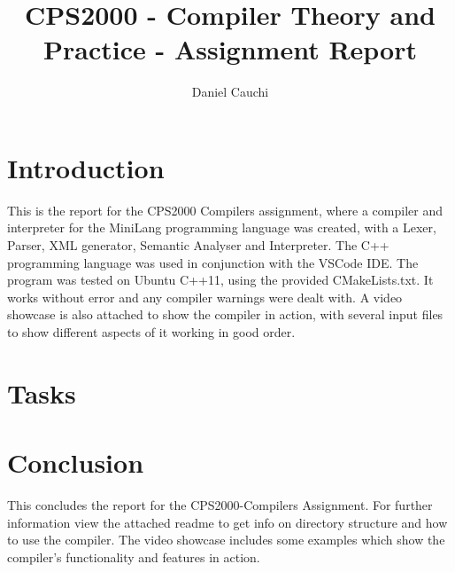 \documentclass{report}
\begin{document}
\title{CPS2000  - Compiler Theory and Practice - Assignment Report}
\author{Daniel Cauchi}
\date{}
\maketitle

\tableofcontents

\chapter{Introduction}
This is the report for the CPS2000 Compilers assignment, where a compiler and interpreter for the MiniLang programming language was created, with a Lexer, Parser, XML generator, Semantic Analyser and Interpreter. The C++ programming language was used in conjunction with the VSCode IDE. The program was tested on Ubuntu C++11, using the provided CMakeLists.txt. It works without error and any compiler warnings were dealt with. A video showcase is also attached to show the compiler in action, with several input files to show different aspects of it working in good order.

\chapter{Tasks}

\pagebreak

\pagebreak

\pagebreak

\pagebreak

\pagebreak

\chapter{Conclusion}
This concludes the report for the CPS2000-Compilers Assignment. For further information view the attached readme to get info on directory structure and how to use the compiler. The video showcase includes some examples which show the compiler's functionality and features in action.

\pagebreak



\end{document}
